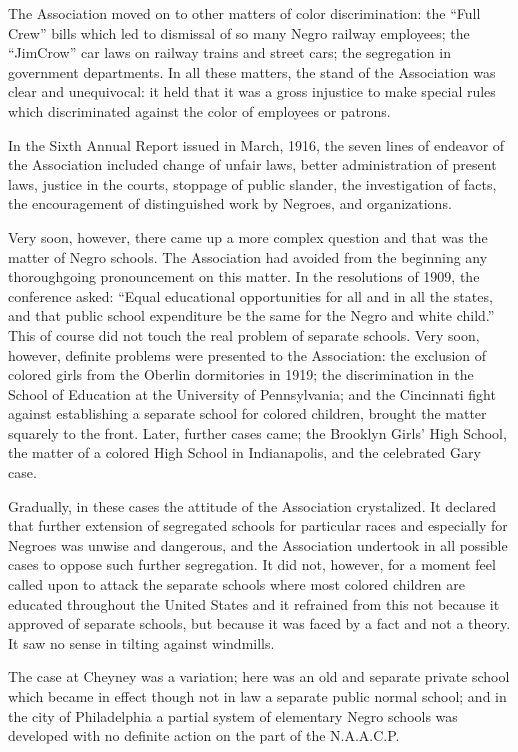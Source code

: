 \documentclass[letterpaper,10pt,english]{jupyterBook}
\begin{document}
\sphinxAtStartPar
The Association moved on to other matters of color discrimination: the “Full Crew” bills which led to dismissal of so many Negro railway employees; the “Jim\sphinxhyphen{}Crow” car laws on railway trains and street cars; the segregation in government departments. In all these matters, the stand of the Association was clear and unequivocal: it held that it was a gross injustice to make special rules which discriminated against the color of employees or patrons.

\sphinxAtStartPar
In the Sixth Annual Report issued in March, 1916, the seven lines of endeavor of the Association included change of unfair laws, better administration of present laws, justice in the courts, stoppage of public slander, the investigation of facts, the encouragement of distinguished work by Negroes, and organizations.

\sphinxAtStartPar
Very soon, however, there came up a more complex question and that was the matter of Negro schools. The Association had avoided from the beginning any thoroughgoing pronouncement on this matter. In the resolutions of 1909, the conference asked: “Equal educational opportunities for all and in all the states, and that public school expenditure be the same for the Negro and white child.” This of course did not touch the real problem of separate schools. Very soon, however, definite problems were presented to the Association: the exclusion of colored girls from the Oberlin dormitories in 1919; the discrimination in the School of Education at the University of Pennsylvania; and the Cincinnati fight against establishing a separate school for colored children, brought the matter squarely to the front. Later, further cases came; the Brooklyn Girls’ High School, the matter of a colored High School in Indianapolis, and the celebrated Gary case.

\sphinxAtStartPar
Gradually, in these cases the attitude of the Association crystalized. It declared that further extension of segregated schools for particular races and especially for Negroes was unwise and dangerous, and the Association undertook in all possible cases to oppose such further segregation. It did not, however, for a moment feel called upon to attack the separate schools where most colored children are educated throughout the United States and it refrained from this not because it approved of separate schools, but because it was faced by a fact and not a theory. It saw no sense in tilting against windmills.

\sphinxAtStartPar
The case at Cheyney was a variation; here was an old and separate private school which became in effect though not in law a separate public normal school; and in the city of Philadelphia a partial system of elementary Negro schools was developed with no definite action on the part of the N.A.A.C.P.
\end{document}
